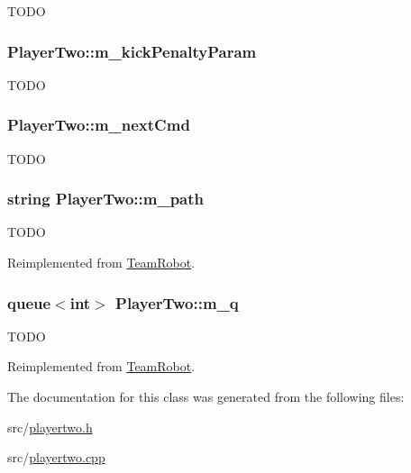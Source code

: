 \label{classPlayerTwo_af294f3bef80e0df881b4452c1272376a}
TODO \hypertarget{classPlayerTwo_ac0b6376133a18b87e4fa14036a32f0ff}{
\subsubsection[{m\_\-kickPenaltyParam}]{ {\bf PlayerTwo::m\_\-kickPenaltyParam}}}
\label{classPlayerTwo_ac0b6376133a18b87e4fa14036a32f0ff}
TODO \hypertarget{classPlayerTwo_a35bab8a32976849cd72828a1a1fe8504}{
\subsubsection[{m\_\-nextCmd}]{ {\bf PlayerTwo::m\_\-nextCmd}}}
\label{classPlayerTwo_a35bab8a32976849cd72828a1a1fe8504}
TODO \hypertarget{classPlayerTwo_af9880885ced53351b52dcc949f6df162}{
\subsubsection[{m\_\-path}]{\setlength{\rightskip}{0pt plus 5cm}string {\bf PlayerTwo::m\_\-path}}}
\label{classPlayerTwo_af9880885ced53351b52dcc949f6df162}
TODO 

Reimplemented from \hyperlink{classTeamRobot_af170b8d2e1b76b12f8cc83f6ec908e40}{TeamRobot}.

\hypertarget{classPlayerTwo_ac2f70709bd48ad9f5c2435cbff1e65b3}{
\subsubsection[{m\_\-q}]{\setlength{\rightskip}{0pt plus 5cm}queue$<$int$>$ {\bf PlayerTwo::m\_\-q}}}
\label{classPlayerTwo_ac2f70709bd48ad9f5c2435cbff1e65b3}
TODO 

Reimplemented from \hyperlink{classTeamRobot_a982ed6b6964c5e8b94519ef91b52c468}{TeamRobot}.



The documentation for this class was generated from the following files:\begin{DoxyCompactItemize}
\item 
src/\hyperlink{playertwo_8h}{playertwo.h}\item 
src/\hyperlink{playertwo_8cpp}{playertwo.cpp}\end{DoxyCompactItemize}
